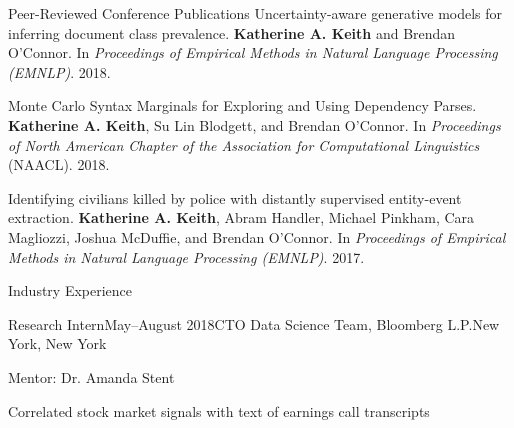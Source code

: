 \documentclass{resume} %
\begin{document}
%
\begin{rSection}{Peer-Reviewed Conference Publications}
Uncertainty-aware generative models for inferring document class prevalence.
\textbf{Katherine A. Keith} and Brendan O'Connor. 
In \emph{Proceedings of Empirical Methods in Natural Language Processing (EMNLP)}. 2018. 

Monte Carlo Syntax Marginals for Exploring and Using Dependency Parses.
\textbf{Katherine A. Keith}, Su Lin Blodgett, and Brendan O'Connor.
In \emph{Proceedings of North American Chapter of the Association for Computational Linguistics} (NAACL). 2018.

Identifying civilians killed by police with distantly supervised entity-event extraction. 
\textbf{Katherine A. Keith}, Abram Handler, Michael Pinkham, Cara Magliozzi, Joshua McDuffie, and Brendan O'Connor. In \emph{Proceedings of Empirical Methods in Natural Language Processing (EMNLP)}. 2017. 

\end{rSection}


\begin{rSection}{Industry Experience}

\begin{rSubsection}{Research Intern}{May--August 2018}{CTO Data Science Team, Bloomberg L.P.}{New York, New York}
\item Mentor: Dr. Amanda Stent
\item Correlated stock market signals with text of earnings call transcripts 
\end{rSubsection}

\end{rSection}

\end{document}
